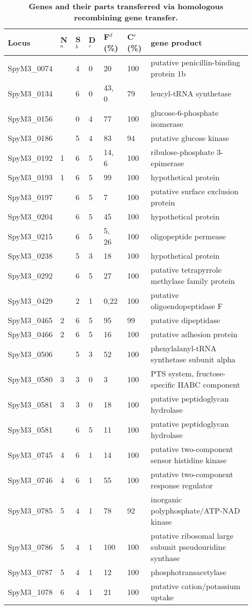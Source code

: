 \documentclass[10pt]{article}
\providecommand{\tabularnewline}{\\}
\begin{document}
\begin{table}[!ht]
\caption{
\bf{Genes and their parts transferred via homologous
recombining gene transfer.}}
{\footnotesize
\begin{tabular}{lllllll}
\hline 
Locus  & N$^a$  & S$^b$  & D$^c$ & F$^d$(\%)  & C$^e$(\%)  & gene 
product\tabularnewline
\hline 
SpyM3\_0074  &  & 4  & 0  & 20  & 100  & putative penicillin-binding protein 1b 
\tabularnewline
SpyM3\_0134  &  & 6  & 0  & 43, 0 & 79  & leucyl-tRNA synthetase \tabularnewline
SpyM3\_0156  &  & 0  & 4  & 77  & 100  & glucose-6-phosphate isomerase 
\tabularnewline
SpyM3\_0186  &  & 5  & 4  & 83  & 94  & putative glucose kinase \tabularnewline
SpyM3\_0192  & 1 & 6  & 5  & 14, 6 & 100  & ribulose-phosphate 3-epimerase 
\tabularnewline
SpyM3\_0193  & 1 & 6  & 5  & 99  & 100  & hypothetical protein\tabularnewline
SpyM3\_0197  &  & 6  & 5  & 7  & 100  & putative surface exclusion 
protein\tabularnewline
SpyM3\_0204  &  & 6  & 5  & 45  & 100  & hypothetical protein \tabularnewline
SpyM3\_0215  &  & 6  & 5  & 5, 26 & 100  & oligopeptide permease \tabularnewline
SpyM3\_0238  &  & 5  & 3  & 18  & 100  & hypothetical protein \tabularnewline
SpyM3\_0292  &  & 6  & 5  & 27  & 100  & putative tetrapyrrole methylase family 
protein \tabularnewline
SpyM3\_0429  &  & 2  & 1  & 0,22  & 100  & putative oligoendopeptidase 
F\tabularnewline
SpyM3\_0465  & 2 & 6  & 5  & 95  & 99  & putative dipeptidase \tabularnewline
SpyM3\_0466  & 2 & 6  & 5  & 16  & 100  & putative adhesion protein 
\tabularnewline
SpyM3\_0506  &  & 5  & 3  & 52  & 100  & phenylalanyl-tRNA synthetase subunit 
alpha \tabularnewline
SpyM3\_0580  & 3 & 3  & 0  & 3  & 100  & PTS system, fructose-specific IIABC 
component\tabularnewline
SpyM3\_0581  & 3 & 3  & 0  & 18  & 100  & putative peptidoglycan hydrolase 
\tabularnewline
SpyM3\_0581  &  & 6  & 5  & 11  & 100  & putative peptidoglycan hydrolase 
\tabularnewline
SpyM3\_0745  & 4 & 6  & 1  & 14  & 100  & putative two-component sensor 
histidine kinase \tabularnewline
SpyM3\_0746  & 4 & 6  & 1  & 55  & 100  & putative two-component response 
regulator \tabularnewline
SpyM3\_0785  & 5 & 4  & 1  & 78  & 92  & inorganic polyphosphate/ATP-NAD 
kinase\tabularnewline
SpyM3\_0786  & 5 & 4  & 1  & 100  & 100  & putative ribosomal large subunit 
pseudouridine synthase \tabularnewline
SpyM3\_0787  & 5 & 4  & 1  & 12  & 100  & phosphotransacetylase \tabularnewline
SpyM3\_1078  & 6 & 4  & 1  & 21  & 100  & putative cation/potassium uptake 

\end{tabular}}
\end{table}
\end{document}
